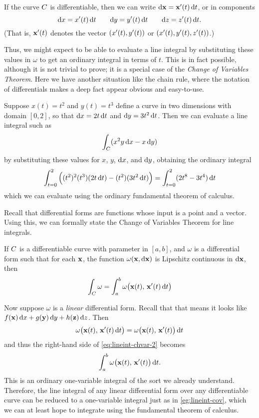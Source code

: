 \documentclass[12pt]{amsart}
\begin{document}
If the curve $C$ is differentiable, then we can write $\mathrm{d}\mathbf{x} = \mathbf{x}'(t)\,{\mathrm{d} t}$, or in components
\[{\mathrm{d} x} = x'(t)\,{\mathrm{d} t} \qquad {\ensuremath{\mathrm{d} y}} = y'(t) \,{\mathrm{d} t} \qquad {\ensuremath{\mathrm{d} z}} = z'(t)\,{\mathrm{d} t}. \]
(That is, $\mathbf{x}'(t)$ denotes the vector $(x'(t),y'(t))$ or $(x'(t),y'(t),z'(t))$.)

Thus, we might expect to be able to evaluate a line integral by substituting these values in $\omega$ to get an ordinary integral in terms of $t$.
This is in fact possible, although it is not trivial to prove; it is a special case of the \emph{Change of Variables Theorem}.
Here we have another situation like the chain rule, where the notation of differentials makes a deep fact appear obvious and easy-to-use.

\begin{eg}\label{eg:lineint-cov}
  Suppose $x(t) = t^2$ and $y(t) = t^3$ define a curve in two dimensions with domain $[0,2]$, so that ${\mathrm{d} x} = 2t\,{\mathrm{d} t}$ and ${\mathrm{d} y} = 3t^2\,{\mathrm{d} t}$.
  Then we can evaluate a line integral such as
  \[ \int_{C} (x^2 y \,{\mathrm{d} x} - x \,{\mathrm{d} y}) \]
  by substituting these values for $x$, $y$, ${\mathrm{d} x}$, and ${\mathrm{d} y}$, obtaining the ordinary integral
  \[ \int_{t=0}^2 \Big( (t^2)^2(t^3)(2t\,{\mathrm{d} t}) - (t^2)(3t^2\,{\mathrm{d} t})\Big)
  = \int_{t=0}^2 (2t^8 - 3t^4)\,{\mathrm{d} t}\]
  which we can evaluate using the ordinary fundamental theorem of calculus.
\end{eg}

Recall that differential forms are functions whose input is a point and a vector.
Using this, we can formally state the Change of Variables Theorem for line integrals.

\begin{thm}
  If $C$ is a differentiable curve with parameter in $[a,b]$, and $\omega$ is a differential form such that for each $\mathbf{x}$, the function $\omega(\mathbf{x},{\mathrm{d} \mathbf{x}})$ is Lipschitz continuous in ${\mathrm{d} \mathbf{x}}$, then
  \begin{equation}
    \int_{C} \omega = \int_a^b \omega\big(\mathbf{x}(t),\, \mathbf{x}'(t) \,{\mathrm{d} t}\big)\label{eq:lineint-chvar-2}
  \end{equation}
\end{thm}

Now suppose $\omega$ is a \emph{linear} differential form.
Recall that that means it looks like $f(\mathbf{x})\,{\mathrm{d} x} + g(\mathbf{y})\,{\mathrm{d} y} + h(\mathbf{z})\,{\mathrm{d} z}$.
Then
\[ \omega\big(\mathbf{x}(t),\, \mathbf{x}'(t) \,{\mathrm{d} t}\big) = \omega\big(\mathbf{x}(t),\, \mathbf{x}'(t)\big)\,{\mathrm{d} t} \]
and thus the right-hand side of \cref{eq:lineint-chvar-2} becomes
\[ \int_a^b \omega\big(\mathbf{x}(t),\, \mathbf{x}'(t)\big)\,{\mathrm{d} t}. \]
This is an ordinary one-variable integral of the sort we already understand.
Therefore, the line integral of any linear differential form over any differentiable curve can be reduced to a one-variable integral just as in \cref{eg:lineint-cov}, which we can at least hope to integrate using the fundamental theorem of calculus.
\end{document}
